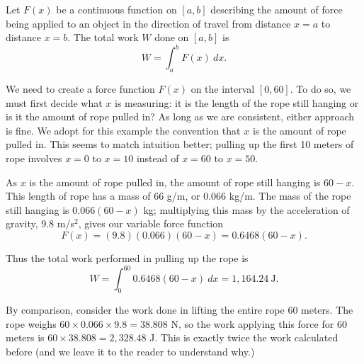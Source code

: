 {Let $F(x)$ be a continuous function on $[a,b]$ describing the amount of force being applied to an object in the direction of travel from distance $x=a$ to distance $x=b$. The total work $W$ done on $[a,b]$ is
$$W = \int_a^b F(x)\ dx.$$
}
\clearpage
{}
{We need to create a force function $F(x)$ on the interval $[0,60]$. To do so, we must first decide what $x$ is measuring: it is the length of the rope still hanging or is it the amount of rope pulled in? As long as we are consistent, either approach is fine. We adopt for this example the convention that $x$ is the amount of rope pulled in. This seems to match intuition better; pulling up the first 10 meters of rope involves $x=0$ to $x=10$ instead of $x=60$ to $x=50$. 

As $x$ is the amount of rope pulled in, the amount of rope still hanging is $60-x$. This length of rope has a mass of 66 g/m, or $0.066$ kg/m. The mass of the rope still hanging is $0.066(60-x)$ kg; multiplying this mass by the acceleration of gravity, 9.8 m/s$^2$, gives our variable force function $$F(x) = (9.8)(0.066)(60-x) = 0.6468(60-x).$$

Thus the total work performed in pulling up the rope is 
$$W = \int_0^{60} 0.6468(60-x)\ dx = 1,164.24\ \text{J}.$$

By comparison, consider the work done in lifting the entire rope 60 meters. The rope weighs $60\times 0.066 \times 9.8 = 38.808$ N, so the work applying this force for 60 meters is $60\times 38.808 = 2,328.48$ J. This is exactly twice the work calculated before (and we leave it to the reader to understand why.)
}\\

